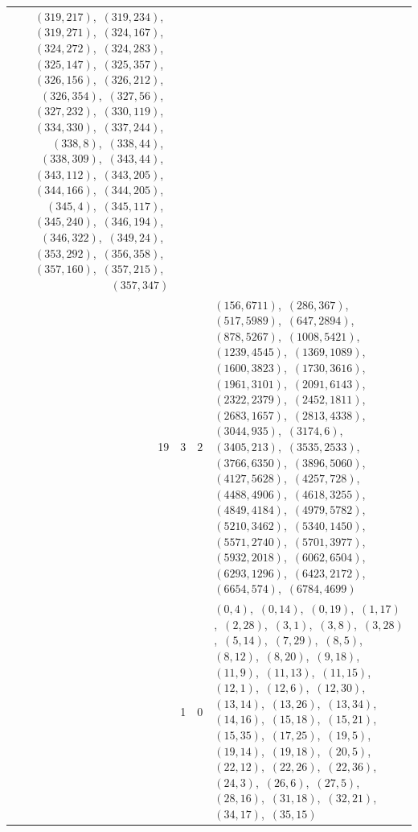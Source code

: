 \documentclass[11pt]{article}
\begin{document}
{\begin{longtable}{@{}rrl>{\raggedright\arraybackslash}p{}@{}}
$(319,217)$,\allowbreak\ $(319,234)$,\allowbreak\ $(319,271)$,\allowbreak\ $(324,167)$,\allowbreak\ $(324,272)$,\allowbreak\ $(324,283)$,\allowbreak\ $(325,147)$,\allowbreak\ $(325,357)$,\allowbreak\ $(326,156)$,\allowbreak\ $(326,212)$,\allowbreak\ $(326,354)$,\allowbreak\ $(327,56)$,\allowbreak\ $(327,232)$,\allowbreak\ $(330,119)$,\allowbreak\ $(334,330)$,\allowbreak\ $(337,244)$,\allowbreak\ $(338,8)$,\allowbreak\ $(338,44)$,\allowbreak\ $(338,309)$,\allowbreak\ $(343,44)$,\allowbreak\ $(343,112)$,\allowbreak\ $(343,205)$,\allowbreak\ $(344,166)$,\allowbreak\ $(344,205)$,\allowbreak\ $(345,4)$,\allowbreak\ $(345,117)$,\allowbreak\ $(345,240)$,\allowbreak\ $(346,194)$,\allowbreak\ $(346,322)$,\allowbreak\ $(349,24)$,\allowbreak\ $(353,292)$,\allowbreak\ $(356,358)$,\allowbreak\ $(357,160)$,\allowbreak\ $(357,215)$,\allowbreak\ $(357,347)$\\
19 & 3 & $2$ & $(156,6711)$,\allowbreak\ $(286,367)$,\allowbreak\ $(517,5989)$,\allowbreak\ $(647,2894)$,\allowbreak\ $(878,5267)$,\allowbreak\ $(1008,5421)$,\allowbreak\ $(1239,4545)$,\allowbreak\ $(1369,1089)$,\allowbreak\ $(1600,3823)$,\allowbreak\ $(1730,3616)$,\allowbreak\ $(1961,3101)$,\allowbreak\ $(2091,6143)$,\allowbreak\ $(2322,2379)$,\allowbreak\ $(2452,1811)$,\allowbreak\ $(2683,1657)$,\allowbreak\ $(2813,4338)$,\allowbreak\ $(3044,935)$,\allowbreak\ $(3174,6)$,\allowbreak\ $(3405,213)$,\allowbreak\ $(3535,2533)$,\allowbreak\ $(3766,6350)$,\allowbreak\ $(3896,5060)$,\allowbreak\ $(4127,5628)$,\allowbreak\ $(4257,728)$,\allowbreak\ $(4488,4906)$,\allowbreak\ $(4618,3255)$,\allowbreak\ $(4849,4184)$,\allowbreak\ $(4979,5782)$,\allowbreak\ $(5210,3462)$,\allowbreak\ $(5340,1450)$,\allowbreak\ $(5571,2740)$,\allowbreak\ $(5701,3977)$,\allowbreak\ $(5932,2018)$,\allowbreak\ $(6062,6504)$,\allowbreak\ $(6293,1296)$,\allowbreak\ $(6423,2172)$,\allowbreak\ $(6654,574)$,\allowbreak\ $(6784,4699)$\\
\addlinespace[3pt]
37 & 1 & $0$ & $(0,4)$,\allowbreak\ $(0,14)$,\allowbreak\ $(0,19)$,\allowbreak\ $(1,17)$,\allowbreak\ $(2,28)$,\allowbreak\ $(3,1)$,\allowbreak\ $(3,8)$,\allowbreak\ $(3,28)$,\allowbreak\ $(5,14)$,\allowbreak\ $(7,29)$,\allowbreak\ $(8,5)$,\allowbreak\ $(8,12)$,\allowbreak\ $(8,20)$,\allowbreak\ $(9,18)$,\allowbreak\ $(11,9)$,\allowbreak\ $(11,13)$,\allowbreak\ $(11,15)$,\allowbreak\ $(12,1)$,\allowbreak\ $(12,6)$,\allowbreak\ $(12,30)$,\allowbreak\ $(13,14)$,\allowbreak\ $(13,26)$,\allowbreak\ $(13,34)$,\allowbreak\ $(14,16)$,\allowbreak\ $(15,18)$,\allowbreak\ $(15,21)$,\allowbreak\ $(15,35)$,\allowbreak\ $(17,25)$,\allowbreak\ $(19,5)$,\allowbreak\ $(19,14)$,\allowbreak\ $(19,18)$,\allowbreak\ $(20,5)$,\allowbreak\ $(22,12)$,\allowbreak\ $(22,26)$,\allowbreak\ $(22,36)$,\allowbreak\ $(24,3)$,\allowbreak\ $(26,6)$,\allowbreak\ $(27,5)$,\allowbreak\ $(28,16)$,\allowbreak\ $(31,18)$,\allowbreak\ $(32,21)$,\allowbreak\ $(34,17)$,\allowbreak\ $(35,15)$\\
\end{longtable}
}
\end{document}
